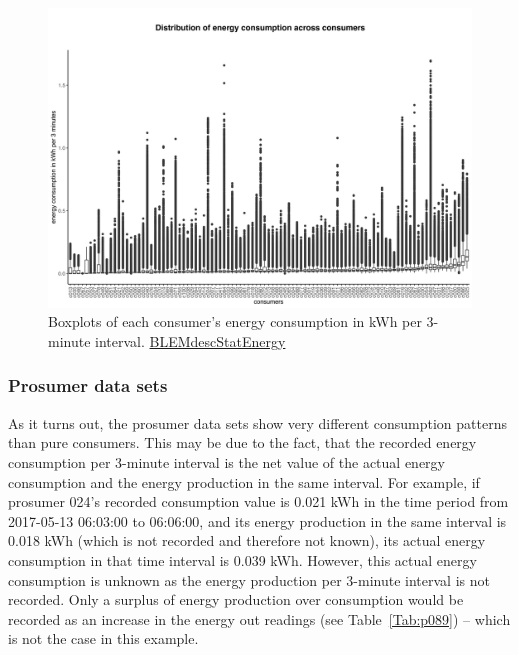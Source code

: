 \begin{figure}[htbp]
 \centering
\includegraphics[width=\textwidth]{thesis/graphs/consumer_boxplots_consumption.jpg}
\caption[Boxplots of each consumer's energy consumption in kWh per 3-minute interval]{Boxplots of each consumer's energy consumption in kWh per 3-minute interval. \quantnet\href{ }{BLEMdescStatEnergy}}
\label{Fig:cons_boxplots_consumption}
\end{figure}

\subsubsection{Prosumer data sets}

As it turns out, the prosumer data sets show very different consumption patterns than pure consumers. This may be due to the fact, that the recorded energy consumption per 3-minute interval is the net value of the actual energy consumption and the energy production in the same interval. For example, if prosumer 024's recorded consumption value is 0.021 kWh in the time period from 2017-05-13 06:03:00 to 06:06:00, and its energy production in the same interval is 0.018 kWh (which is not recorded and therefore not known), its actual energy consumption in that time interval is 0.039 kWh. However, this actual energy consumption is unknown as the energy production per 3-minute interval is not recorded. Only a surplus of energy production over consumption would be recorded as an increase in the energy out readings (see Table~\ref{Tab:p089}) -- which is not the case in this example.

